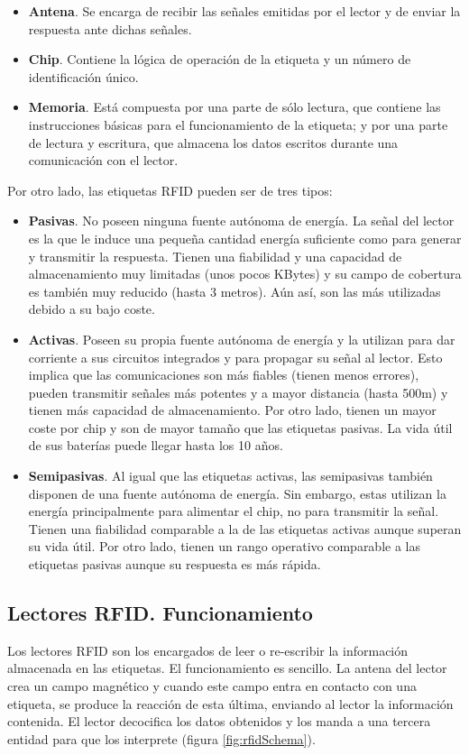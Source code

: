   \begin{itemize}
    \item \textbf{Antena}. Se encarga de recibir las señales emitidas por el
  lector y de enviar la respuesta ante dichas señales.
    \item \textbf{Chip}. Contiene la lógica de operación de la etiqueta y un
  número de identificación único.
    \item \textbf{Memoria}. Está compuesta por una parte de sólo lectura,
  que contiene las instrucciones básicas para el funcionamiento de la etiqueta;
  y por una parte de lectura y escritura, que almacena los datos escritos
  durante una comunicación con el lector.
  \end{itemize}
  
  Por otro lado, las etiquetas \ac{RFID} pueden ser de tres tipos:
  \begin{itemize}
    \item \textbf{Pasivas}. No poseen ninguna fuente autónoma de energía. La
  señal del lector es la que le induce una pequeña cantidad energía suficiente 
  como para generar y transmitir la respuesta. Tienen una fiabilidad y una
  capacidad de almacenamiento muy limitadas (unos pocos KBytes) y su campo de
  cobertura es también muy reducido (hasta 3 metros). Aún así, son las más
  utilizadas debido a su bajo coste.
   \item \textbf{Activas}. Poseen su propia fuente autónoma de energía y la
  utilizan para dar corriente a sus circuitos integrados y para propagar su
  señal al lector. Esto implica que las comunicaciones son más fiables (tienen
  menos errores), pueden transmitir señales más potentes y a mayor distancia
  (hasta 500m) y tienen más capacidad de almacenamiento. Por otro lado, tienen
  un mayor coste por chip y son de mayor tamaño que las etiquetas pasivas. La
  vida útil de sus baterías puede llegar hasta los 10 años.
    \item \textbf{Semipasivas}. Al igual que las etiquetas activas, las
  semipasivas también disponen de una fuente autónoma de energía. Sin embargo,
  estas utilizan la energía principalmente para alimentar el chip, no para
  transmitir la señal. Tienen una fiabilidad comparable a la de las etiquetas
  activas aunque superan su vida útil. Por otro lado, tienen un rango
  operativo comparable a las etiquetas pasivas aunque su respuesta es más
  rápida.
  \end{itemize}

    \subsection{Lectores RFID. Funcionamiento}
  Los lectores \acs{RFID} son los encargados de leer o re-escribir la
  información almacenada en las etiquetas.
  El funcionamiento es sencillo. La antena del lector crea un campo magnético
  y cuando este campo entra en contacto con una etiqueta, se produce la
  reacción de esta última, enviando al lector la información contenida.
  El lector decocifica los datos obtenidos y los manda a una tercera entidad 
  para que los interprete (figura \ref{fig:rfidSchema}).

